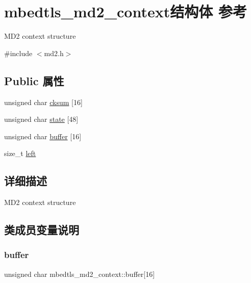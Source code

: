\hypertarget{structmbedtls__md2__context}{}\section{mbedtls\+\_\+md2\+\_\+context结构体 参考}
\label{structmbedtls__md2__context}


M\+D2 context structure  




{\ttfamily \#include $<$md2.\+h$>$}

\subsection*{Public 属性}
\begin{DoxyCompactItemize}
\item 
unsigned char \hyperlink{structmbedtls__md2__context_a12653607373c617159907a4b5d533c94}{cksum} \mbox{[}16\mbox{]}
\item 
unsigned char \hyperlink{structmbedtls__md2__context_a2849ae4cd7a078459349c046e97ae503}{state} \mbox{[}48\mbox{]}
\item 
unsigned char \hyperlink{structmbedtls__md2__context_ae08fe6f2378ed0bb8f226b8905924ad8}{buffer} \mbox{[}16\mbox{]}
\item 
size\+\_\+t \hyperlink{structmbedtls__md2__context_a5b070937560df586b3b20287cc6c4bbe}{left}
\end{DoxyCompactItemize}


\subsection{详细描述}
M\+D2 context structure 

\subsection{类成员变量说明}
\mbox{\label{structmbedtls__md2__context_ae08fe6f2378ed0bb8f226b8905924ad8}} 
\subsubsection{\texorpdfstring{buffer}{buffer}}
{\footnotesize\ttfamily unsigned char mbedtls\+\_\+md2\+\_\+context\+::buffer\mbox{[}16\mbox{]}}

